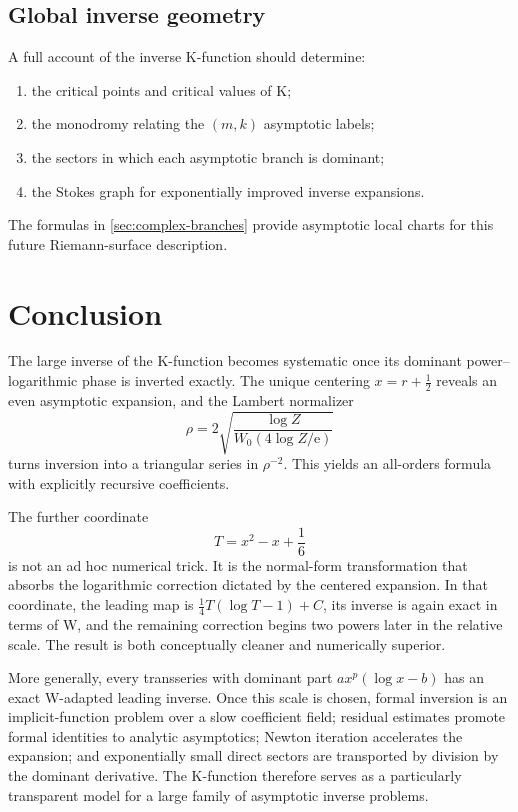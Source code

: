 \documentclass[11pt,a4paper]{article}
\numberwithin{equation}{section}
\theoremstyle{remark}
\newcommand{\e}{\mathrm e}
\begin{document}
\subsection{Global inverse geometry}

A full account of the inverse K-function should determine:
\begin{enumerate}
\item the critical points and critical values of K;
\item the monodromy relating the \((m,k)\) asymptotic labels;
\item the sectors in which each asymptotic branch is dominant;
\item the Stokes graph for exponentially improved inverse expansions.
\end{enumerate}
The formulas in \cref{sec:complex-branches} provide asymptotic local charts
for this future Riemann-surface description.

\section{Conclusion}

The large inverse of the K-function becomes systematic once its dominant
power--logarithmic phase is inverted exactly.  The unique centering
\(x=r+\tfrac12\) reveals an even asymptotic expansion, and the Lambert
normalizer
\[
\rho=2\sqrt{\frac{\log Z}{W_0(4\log Z/\e)}}
\]
turns inversion into a triangular series in \(\rho^{-2}\).  This yields an
all-orders formula with explicitly recursive coefficients.

The further coordinate
\[
T=x^2-x+\frac16
\]
is not an ad hoc numerical trick.  It is the normal-form transformation that
absorbs the logarithmic correction dictated by the centered expansion.  In
that coordinate, the leading map is
\(\tfrac14T(\log T-1)+C\), its inverse is again exact in terms of W, and the
remaining correction begins two powers later in the relative scale.  The
result is both conceptually cleaner and numerically superior.

More generally, every transseries with dominant part
\(a x^p(\log x-b)\) has an exact W-adapted leading inverse.  Once this scale
is chosen, formal inversion is an implicit-function problem over a slow
coefficient field; residual estimates promote formal identities to analytic
asymptotics; Newton iteration accelerates the expansion; and exponentially
small direct sectors are transported by division by the dominant derivative.
The K-function therefore serves as a particularly transparent model for a
large family of asymptotic inverse problems.
\end{document}
